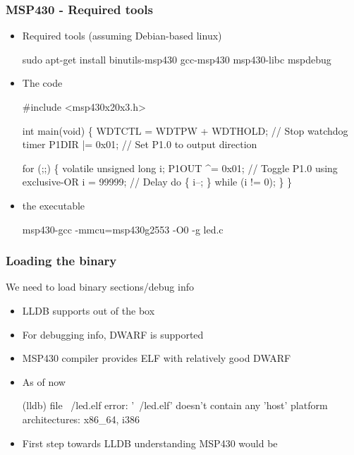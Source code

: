 \begin{frame}[fragile]
\frametitle{MSP430 - Required tools}
\vspace{-3pt}
\begin{itemize}
    \item Required tools (assuming Debian-based linux)
\begin{codebox}
sudo apt-get install binutils-msp430 gcc-msp430 msp430-libc mspdebug
\end{codebox}
\item The code
\begin{codebox2}
#include  <msp430x20x3.h>

int main(void)
\{
    WDTCTL = WDTPW + WDTHOLD;                 // Stop watchdog timer
    P1DIR |= 0x01;                            // Set P1.0 to output direction

    for (;;)
    \{
        volatile unsigned long i;
        P1OUT ^= 0x01;                          // Toggle P1.0 using exclusive-OR
        i = 99999;                              // Delay
        do 
        \{
            i--;
        \} while (i != 0);
    \}
\}
\end{codebox2}
\item {} the executable
\begin{codebox}
msp430-gcc -mmcu=msp430g2553 -O0 -g led.c
\end{codebox}
\end{itemize}
\end{frame}


\begin{frame}[fragile]
\frametitle{Loading the binary}
We need to load binary sections/debug info
\begin{itemize}
    \setlength\itemsep{1em}
    \item LLDB supports  out of the box
    \item For debugging info, DWARF is supported
    \item MSP430 compiler provides ELF with relatively good DWARF
    \item As of now
    \begin{codebox}
(lldb) file ~/led.elf
error: '~/led.elf' doesn't contain any 'host' platform 
architectures: x86_64, i386    
    \end{codebox}
    \item First step towards LLDB understanding MSP430 would be 
\end{itemize}
\end{frame}

